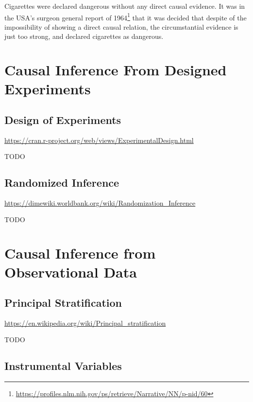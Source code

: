 \documentclass[]{book}
\renewcommand{\href}[2]{#2\footnote{\url{#1}}}
\theoremstyle{definition}
\theoremstyle{definition}
\theoremstyle{definition}
\theoremstyle{remark}
\begin{document}
Cigarettes were declared dangerous without any direct causal evidence.
It was in the USA's \href{https://profiles.nlm.nih.gov/ps/retrieve/Narrative/NN/p-nid/60}{surgeon general report of 1964} that it was decided that despite of the impossibility of showing a direct causal relation, the circumstantial evidence is just too strong, and declared cigarettes as dangerous.

\hypertarget{causal-inference-from-designed-experiments}{%
\section{Causal Inference From Designed Experiments}\label{causal-inference-from-designed-experiments}}

\hypertarget{design-of-experiments}{%
\subsection{Design of Experiments}\label{design-of-experiments}}

\url{https://cran.r-project.org/web/views/ExperimentalDesign.html}

TODO

\hypertarget{randomized-inference}{%
\subsection{Randomized Inference}\label{randomized-inference}}

\url{https://dimewiki.worldbank.org/wiki/Randomization_Inference}

TODO

\hypertarget{causal-inference-from-observational-data}{%
\section{Causal Inference from Observational Data}\label{causal-inference-from-observational-data}}

\hypertarget{principal-stratification}{%
\subsection{Principal Stratification}\label{principal-stratification}}

\citet{frumento2012evaluating}

\url{https://en.wikipedia.org/wiki/Principal_stratification}

TODO

\hypertarget{instrumental-variables}{%
\subsection{Instrumental Variables}\label{instrumental-variables}}
\end{document}
